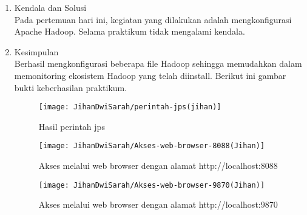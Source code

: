 \begin{enumerate}
\item Kendala dan Solusi \\
Pada pertemuan hari ini, kegiatan yang dilakukan adalah mengkonfigurasi Apache Hadoop. Selama praktikum tidak mengalami kendala.

\item Kesimpulan \\
Berhasil mengkonfigurasi beberapa file Hadoop sehingga memudahkan dalam memonitoring ekosistem Hadoop yang telah diinstall. Berikut ini gambar bukti keberhasilan praktikum. 

\begin{figure}[!ht]
\texttt{[image: JihanDwiSarah/perintah-jps(jihan)]}
\caption{Hasil perintah jps}
\label{gam:perintah-jps(jihan)}
\end{figure} 

\vspace*{-1cm}
\begin{figure}[!ht]
\texttt{[image: JihanDwiSarah/Akses-web-browser-8088(Jihan)]}
\caption{Akses melalui web browser dengan alamat http://localhost:8088}
\label{gam:Akses-web-browser-8088(Jihan)}
\end{figure} 

\vspace*{-1cm}
\begin{figure}[!ht]
\texttt{[image: JihanDwiSarah/Akses-web-browser-9870(Jihan)]}
\caption{Akses melalui web browser dengan alamat http://localhost:9870}
\label{gam:Akses-web-browser-9870(Jihan)}
\end{figure} 
\end{enumerate}